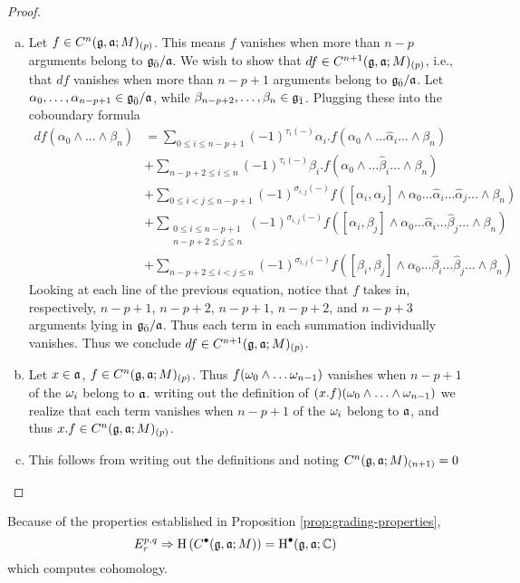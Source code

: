 \begin{proof}
  \begin{enumerate}[(a)]
  \item Let $f \in C^n(\mathfrak{g},\mathfrak{a};M)_{(p)}$. This means $f$ vanishes when more than $n-p$ arguments belong to ${\mathfrak{g}}_{\bar{0}}/\mathfrak{a}$. We wish to show that $df \in C^{n+1}(\mathfrak{g},\mathfrak{a};M)_{(p)}$, i.e., that $df$ vanishes when more than $n-p+1$ arguments belong to ${\mathfrak{g}}_{\bar{0}}/\mathfrak{a}$. Let $\alpha_0, \ldots , \alpha_{n-p+1} \in {\mathfrak{g}}_{\bar{0}}/\mathfrak{a}$, while $\beta_{n-p+2},\ldots,\beta_n \in {\mathfrak{g}}_{\bar{1}}$. Plugging these into the coboundary formula
    \begin{align*}
      df(\alpha_0 \wedge \ldots \wedge \beta_n)
      &= \sum_{0 \leq i \leq n-p+1} (-1)^{\tau_i(-)} \alpha_i . f(\alpha_0 \wedge \ldots \hat \alpha_i \ldots \wedge \beta_n) \\
      & + \sum_{n-p+2 \leq i \leq n} (-1)^{\tau_i(-)} \beta_i .f(\alpha_0 \wedge \ldots \hat \beta_i \ldots \wedge \beta_n) \\
      &+ \sum_{0 \leq i < j \leq n-p+1 } (-1)^{\sigma_{i,j}(-)} f([\alpha_i,\alpha_j] \wedge \alpha_0 \ldots \hat \alpha_i \ldots \hat \alpha_j \ldots \wedge \beta_n) \\
      & + \sum_{\substack{0 \leq i \leq n-p+1 \\ n-p+2 \leq j \leq n}} (-1)^{\sigma_{i,j}(-)} f([\alpha_i,\beta_j]\wedge \alpha_0 \ldots \hat \alpha_i \ldots \hat \beta_j \ldots \wedge \beta_n) \\
      &+ \sum_{n-p+2 \leq i < j \leq n} (-1)^{\sigma_{i,j}(-)} f([\beta_i,\beta_j] \wedge \alpha_0 \ldots \hat \beta_i \ldots \hat \beta_j \ldots \wedge \beta_n)
    \end{align*}
    Looking at each line of the previous equation, notice that $f$ takes in, respectively, $n-p+1$, $n-p+2$, $n-p+1$, $n-p+2$, and $n-p+3$ arguments lying in ${\mathfrak{g}}_{\bar{0}}/\mathfrak{a}$. Thus each term in each summation individually vanishes. Thus we conclude $df \in C^{n+1}(\mathfrak{g},\mathfrak{a};M)_{(p)}$.
  \item Let $x \in \mathfrak{a}$, $f \in C^n(\mathfrak{g},\mathfrak{a};M)_{(p)}$. Thus $f(\omega_0 \wedge \ldots \omega_{n-1})$ vanishes when $n-p+1$ of the $\omega_i$ belong to $\mathfrak{a}$. writing out the definition of $(x.f)(\omega_0\wedge\ldots\wedge\omega_{n-1})$ we realize that each term vanishes when $n-p+1$ of the $\omega_i$ belong to $\mathfrak{a}$, and thus $x.f \in C^n(\mathfrak{g},\mathfrak{a};M)_{(p)}$.
  \item This follows from writing out the definitions and noting $C^n(\mathfrak{g},\mathfrak{a};M)_{(n+1)} = 0$
  \end{enumerate}
\end{proof}
Because of the properties established in Proposition \ref{prop:grading-properties}, 
\begin{equation}
  \label{eq:spectral-sequence}
  E_{r}^{p,q} \Rightarrow \operatorname{H}\left(C^\bullet(\mathfrak{g},\mathfrak{a};M)\right) = \operatorname{H}^\bullet(\mathfrak{g},\mathfrak{a};\mathbb{C})
\end{equation}
which computes cohomology.


